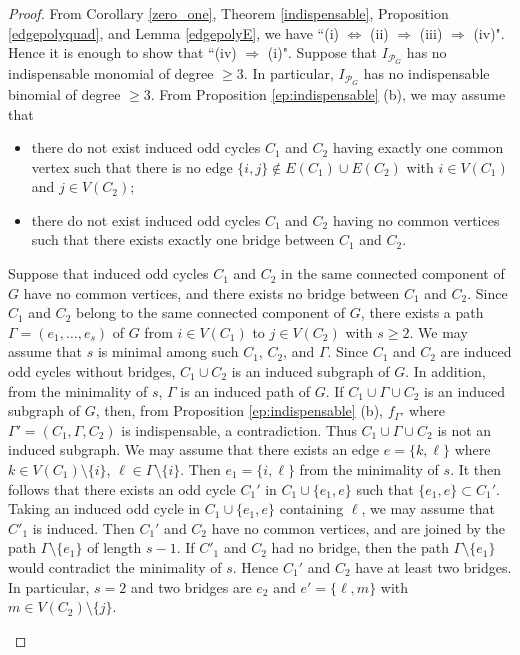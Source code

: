 \documentclass[12pt]{amsart}
\theoremstyle{definition}
\numberwithin{thm}{section}
\numberwithin{equation}{section}
\def\epoly{{\mathcal P}_G}
\begin{document}
\begin{proof}
From Corollary \ref{zero_one}, Theorem \ref{indispensable}, Proposition \ref{edgepolyquad}, and Lemma \ref{edgepolyE}, we have
    ``(i) $\Leftrightarrow$ (ii) $\Rightarrow $ (iii) $\Rightarrow $ (iv)".
    Hence it is enough to show that ``(iv) $\Rightarrow $ (i)".
Suppose that %
        $I_{\epoly}$ has no indispensable monomial of degree $\ge 3$.
        In particular, $I_{\epoly}$ has no indispensable binomial of degree $\ge 3$.
        From Proposition \ref{ep:indispensable} (b), 
        we may assume that
        \begin{itemize}
            \item
            there do not exist induced odd cycles \(C_1\) and \(C_2\) having exactly one common vertex such that there is no edge
\(\{i,j\} \notin E(C_1)\cup E(C_2)\) with
\(i\in V(C_1)\) and \(j\in V(C_2)\);

 \item 
 there do not exist induced odd cycles \(C_1\) and \(C_2\) having no common vertices such that there exists exactly one bridge between \(C_1\) and \(C_2\).
        \end{itemize}

 Suppose that induced odd cycles $C_1$ and $C_2$ 
 in the same connected component of $G$ have no common
 vertices, and there exists no bridge between $C_1$ and $C_2$.
Since $C_1$ and $C_2$ belong to the same connected component of $G$, there exists a path $\Gamma = (e_1,\dots,e_s)$ of $G$
from $i \in V(C_1)$ to $j \in V(C_2)$ with $s \ge 2$.
We may assume that $s$ is minimal among such $C_1$, $C_2$, and $\Gamma$.
Since $C_1$ and $C_2$ are induced odd cycles without bridges,
$C_1 \cup C_2$ is an induced subgraph of $G$.
In addition, from the minimality of $s$, $\Gamma$ is an induced path of $G$.
If $C_1 \cup \Gamma \cup C_2$ is an induced subgraph of $G$, then, 
from Proposition \ref{ep:indispensable} (b), $f_{\Gamma'}$ where $\Gamma' =(C_1, \Gamma ,C_2)$
 is indispensable, a contradiction. 
Thus $C_1 \cup \Gamma \cup C_2$ is not an induced subgraph.
We may assume that there exists an edge $e=\{k,\ell\}$ where $k \in V(C_1) \setminus \{i\}$, $\ell \in \Gamma \setminus \{i\}$.
Then $e_1 = \{i,\ell\}$ from the minimality of $s$.
It then follows that there exists an odd cycle $C_1'$ in $C_1 \cup \{e_1, e\}$
such that $\{e_1, e\} \subset C_1'$.
Taking an induced odd cycle in \(C_1\cup\{e_1,e\}\) containing \(\ell\),
we may assume that \(C'_1\) is induced.
Then 
$C_1'$ and $C_2$ have no common vertices,
and are joined by the path $\Gamma \setminus \{e_1\}$ of length $s-1$.
If \(C'_1\) and \(C_2\) had no bridge, then the path
\(\Gamma\setminus\{e_1\}\) would contradict the minimality of \(s\).
Hence 
$C_1'$ and $C_2$ have at least two bridges.
In particular, $s=2$ and two bridges are $e_2$
and $e'=\{\ell, m\}$ with $m \in V(C_2) \setminus \{j\}$.
\begin{center}  
\begin{tikzpicture}[scale=0.7,transform shape,
    vertex/.style={circle,draw,minimum size=2mm,inner sep=0pt},
    every node/.style={font=\large}
]


\end{tikzpicture}
\end{center}
\end{proof}
\end{document}
